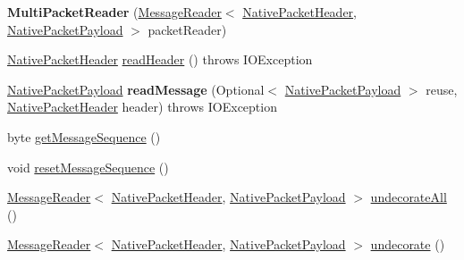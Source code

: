 \begin{DoxyCompactItemize}
\item 
\mbox{\label{classcom_1_1mysql_1_1cj_1_1protocol_1_1a_1_1_multi_packet_reader_a73909539b9b69319ac63a6e29f2f1088}} 
{\bfseries Multi\+Packet\+Reader} (\mbox{\hyperlink{interfacecom_1_1mysql_1_1cj_1_1protocol_1_1_message_reader}{Message\+Reader}}$<$ \mbox{\hyperlink{classcom_1_1mysql_1_1cj_1_1protocol_1_1a_1_1_native_packet_header}{Native\+Packet\+Header}}, \mbox{\hyperlink{classcom_1_1mysql_1_1cj_1_1protocol_1_1a_1_1_native_packet_payload}{Native\+Packet\+Payload}} $>$ packet\+Reader)
\item 
\mbox{\hyperlink{classcom_1_1mysql_1_1cj_1_1protocol_1_1a_1_1_native_packet_header}{Native\+Packet\+Header}} \mbox{\hyperlink{classcom_1_1mysql_1_1cj_1_1protocol_1_1a_1_1_multi_packet_reader_a6a0250ba430aacfb45f8e1c0a7907465}{read\+Header}} ()  throws I\+O\+Exception 
\item 
\mbox{\label{classcom_1_1mysql_1_1cj_1_1protocol_1_1a_1_1_multi_packet_reader_a8a2162a4cec91c1cd468b3e00bed871f}} 
\mbox{\hyperlink{classcom_1_1mysql_1_1cj_1_1protocol_1_1a_1_1_native_packet_payload}{Native\+Packet\+Payload}} {\bfseries read\+Message} (Optional$<$ \mbox{\hyperlink{classcom_1_1mysql_1_1cj_1_1protocol_1_1a_1_1_native_packet_payload}{Native\+Packet\+Payload}} $>$ reuse, \mbox{\hyperlink{classcom_1_1mysql_1_1cj_1_1protocol_1_1a_1_1_native_packet_header}{Native\+Packet\+Header}} header)  throws I\+O\+Exception 
\item 
byte \mbox{\hyperlink{classcom_1_1mysql_1_1cj_1_1protocol_1_1a_1_1_multi_packet_reader_a237c52b4c174c917ec8a15a5eb2839d1}{get\+Message\+Sequence}} ()
\item 
void \mbox{\hyperlink{classcom_1_1mysql_1_1cj_1_1protocol_1_1a_1_1_multi_packet_reader_ac0fa7a5f40fc65548bdb17241152b81c}{reset\+Message\+Sequence}} ()
\item 
\mbox{\hyperlink{interfacecom_1_1mysql_1_1cj_1_1protocol_1_1_message_reader}{Message\+Reader}}$<$ \mbox{\hyperlink{classcom_1_1mysql_1_1cj_1_1protocol_1_1a_1_1_native_packet_header}{Native\+Packet\+Header}}, \mbox{\hyperlink{classcom_1_1mysql_1_1cj_1_1protocol_1_1a_1_1_native_packet_payload}{Native\+Packet\+Payload}} $>$ \mbox{\hyperlink{classcom_1_1mysql_1_1cj_1_1protocol_1_1a_1_1_multi_packet_reader_a2a1c000ea384788f1ef5d8add224d309}{undecorate\+All}} ()
\item 
\mbox{\hyperlink{interfacecom_1_1mysql_1_1cj_1_1protocol_1_1_message_reader}{Message\+Reader}}$<$ \mbox{\hyperlink{classcom_1_1mysql_1_1cj_1_1protocol_1_1a_1_1_native_packet_header}{Native\+Packet\+Header}}, \mbox{\hyperlink{classcom_1_1mysql_1_1cj_1_1protocol_1_1a_1_1_native_packet_payload}{Native\+Packet\+Payload}} $>$ \mbox{\hyperlink{classcom_1_1mysql_1_1cj_1_1protocol_1_1a_1_1_multi_packet_reader_a88dba17bd898d3e8516fdb4a096297c5}{undecorate}} ()
\end{DoxyCompactItemize}


